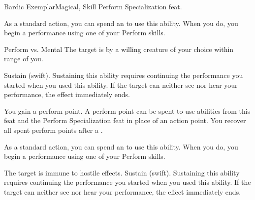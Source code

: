     \begin{feat}{Bardic Exemplar}{Magical, Skill}
        \featpre Perform Specialization feat.
        \featben

         As a standard action, you can spend an  to use this ability.
        When you do, you begin a performance using one of your Perform skills.
        \begin{ability}
            \begin{spelltargetinginfo}
            \end{spelltargetinginfo}
            \begin{spelleffects}
                \begin{spellattack}{Perform vs. Mental}
                    \spellsuccess The target is \taunted by a willing creature of your choice within range of you.
                \end{spellattack}
                \spelldur Sustain (swift). Sustaining this ability requires continuing the performance you started when you used this ability. If the target can neither see nor hear your performance, the effect immediately ends.
            \end{spelleffects}
        \end{ability}

         You gain a perform point.
        A perform point can be spent to use  abilities from this feat and the Perform Specialization feat in place of an action point.
        You recover all spent perform points after a .

         As a standard action, you can spend an  to use this ability.
        When you do, you begin a performance using one of your Perform skills.
        \begin{ability}
            \begin{spelltargetinginfo}
            \end{spelltargetinginfo}
            \begin{spelleffects}
                \spelleffect The target is immune to hostile  effects.
                \spelldur Sustain (swift). Sustaining this ability requires continuing the performance you started when you used this ability. If the target can neither see nor hear your performance, the effect immediately ends.
            \end{spelleffects}
        \end{ability}


\end{feat}
